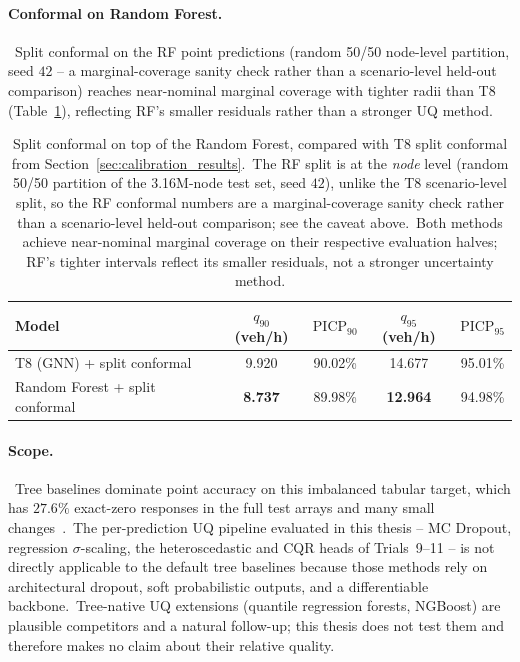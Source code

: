 \paragraph{Conformal on Random Forest.}\ Split conformal on the RF point predictions (random 50/50 node-level partition, seed $42$ -- a marginal-coverage sanity check rather than a scenario-level held-out comparison) reaches near-nominal marginal coverage with tighter radii than T8 (Table~\ref{tab:non_gnn_conformal}), reflecting RF's smaller residuals rather than a stronger UQ method.

\begin{table}[htbp]
\centering
\caption[RF + split conformal vs T8 + split conformal]{Split conformal on top of the Random Forest, compared with T8 split conformal from Section~\ref{sec:calibration_results}.\ The RF split is at the \emph{node} level (random 50/50 partition of the 3.16M-node test set, seed $42$), unlike the T8 scenario-level split, so the RF conformal numbers are a marginal-coverage sanity check rather than a scenario-level held-out comparison; see the caveat above.\ Both methods achieve near-nominal marginal coverage on their respective evaluation halves; RF's tighter intervals reflect its smaller residuals, not a stronger uncertainty method.}
\label{tab:non_gnn_conformal}
\begin{tabular}{lcccc}
\toprule
Model & $q_{90}$ (veh/h) & $\mathrm{PICP}_{90}$ & $q_{95}$ (veh/h) & $\mathrm{PICP}_{95}$ \\
\midrule
T8 (GNN) + split conformal & 9.920 & 90.02\% & 14.677 & 95.01\% \\
Random Forest + split conformal & \textbf{8.737} & 89.98\% & \textbf{12.964} & 94.98\% \\
\bottomrule
\end{tabular}
\end{table}

\paragraph{Scope.}\ Tree baselines dominate point accuracy on this imbalanced tabular target, which has $27.6\%$ exact-zero responses in the full test arrays and many small changes~\cite{grinsztajn2022tree,borisov2022deep}.\ The per-prediction UQ pipeline evaluated in this thesis -- MC Dropout, regression $\sigma$-scaling, the heteroscedastic and CQR heads of Trials~9--11 -- is not directly applicable to the default tree baselines because those methods rely on architectural dropout, soft probabilistic outputs, and a differentiable backbone.\ Tree-native UQ extensions (quantile regression forests, NGBoost) are plausible competitors and a natural follow-up; this thesis does not test them and therefore makes no claim about their relative quality.

